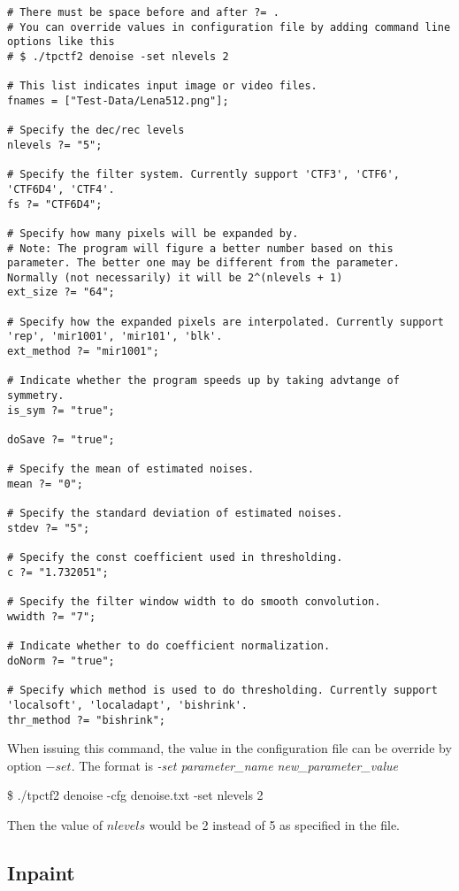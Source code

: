 \documentclass[a4paper,5pt]{article}
\begin{document}
\begin{lstlisting}
# There must be space before and after ?= .
# You can override values in configuration file by adding command line options like this
# $ ./tpctf2 denoise -set nlevels 2

# This list indicates input image or video files.
fnames = ["Test-Data/Lena512.png"];

# Specify the dec/rec levels
nlevels ?= "5";

# Specify the filter system. Currently support 'CTF3', 'CTF6', 'CTF6D4', 'CTF4'.
fs ?= "CTF6D4";

# Specify how many pixels will be expanded by.
# Note: The program will figure a better number based on this parameter. The better one may be different from the parameter. Normally (not necessarily) it will be 2^(nlevels + 1)
ext_size ?= "64";

# Specify how the expanded pixels are interpolated. Currently support 'rep', 'mir1001', 'mir101', 'blk'.
ext_method ?= "mir1001";

# Indicate whether the program speeds up by taking advtange of symmetry.
is_sym ?= "true";

doSave ?= "true";

# Specify the mean of estimated noises.
mean ?= "0";

# Specify the standard deviation of estimated noises.
stdev ?= "5";

# Specify the const coefficient used in thresholding.
c ?= "1.732051";

# Specify the filter window width to do smooth convolution.
wwidth ?= "7";

# Indicate whether to do coefficient normalization.
doNorm ?= "true";

# Specify which method is used to do thresholding. Currently support 'localsoft', 'localadapt', 'bishrink'.
thr_method ?= "bishrink";
\end{lstlisting}

  When issuing this command, the value in the configuration file can be override by option $-set$. The format is \textit{-set parameter\_name  new\_parameter\_value}
  
  \$ ./tpctf2 denoise -cfg denoise.txt -set nlevels 2
  
  Then the value of $nlevels$ would be 2 instead of 5 as specified in the file.
  
\subsection{Inpaint}
\end{document}
